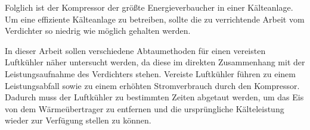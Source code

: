 Folglich ist der Kompressor der größte Energieverbaucher in einer Kälteanlage. Um eine effiziente Kälteanlage zu betreiben, sollte die zu verrichtende Arbeit vom Verdichter so niedrig wie möglich gehalten werden.

In dieser Arbeit sollen verschiedene Abtaumethoden für einen vereisten Luftkühler näher untersucht werden, da diese im direkten Zusammenhang mit der Leistungsaufnahme des Verdichters stehen. Vereiste Luftkühler führen zu einem Leistungsabfall sowie zu einem erhöhten Stromverbrauch durch den Kompressor. Dadurch muss der Luftkühler zu bestimmten Zeiten abgetaut werden, um das Eis von dem Wärmeübertrager zu entfernen und die ursprüngliche Kälteleistung wieder zur Verfügung stellen zu können. 



